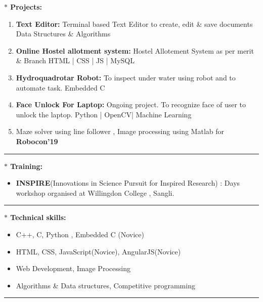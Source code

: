 \documentclass[a4paper,11pt]{article} %
\begin{document}
			\begin{LARGE}
				\textbf{\large $\ast$ Projects:}\medskip%
				{\small
					\begin{enumerate}
						\item \textbf{Text Editor:} Terminal based Text Editor to create, edit \& save documents\newline
						Data Structures \& Algorithms
						\item \textbf{Online Hostel allotment system:} Hostel Allotement System as per merit \& Branch \newline
						 HTML | CSS | JS | MySQL
						\item \textbf{Hydroquadrotar Robot:} To inspect under water using robot and to automate task. \newline
						Embedded C
						\item \textbf{Face Unlock For Laptop:} Ongoing project. To recognize face of user to unlock the laptop.\newline
						Python | OpenCV| Machine Learning
						
						\item Maze solver using line follower , Image processing using Matlab for \textbf{Robocon'19}
					\end{enumerate}
					\bigskip
				}
			\end{LARGE}
\hrule	
\bigskip

			\begin{LARGE}
				\textbf{\large $\ast$ Training:}\medskip%
				{\small
					\begin{itemize}
						\item \textbf{INSPIRE}(Innovations in Science Pursuit for Inspired Research) :  Days workshop organised at Willingdon College , Sangli.
					\end{itemize}
					\bigskip
				}
				
			\end{LARGE}			
\hrule	
\bigskip
			\begin{LARGE}
				\textbf{\large $\ast$ Technical skills:}\medskip%
				{\small
					\begin{itemize}
						\item C++, C, Python , Embedded C (Novice)
						\item  HTML, CSS, JavaScript(Novice), AngularJS(Novice)
						\item Web Development, Image Processing
						\item Algorithms \& Data structures, Competitive programming
					\end{itemize}
					\bigskip
				}
				
			\end{LARGE}
			\medskip
\hrule	
\bigskip
\end{document}
